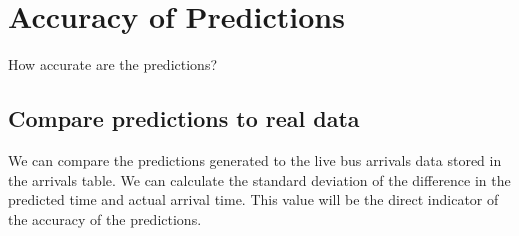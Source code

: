 \section{Accuracy of Predictions}
How accurate are the predictions?
\subsection{Compare predictions to real data}
We can compare the predictions generated to the live bus arrivals data stored in the arrivals table. We can calculate the standard deviation of the difference in the predicted time and actual arrival time. This value will be the direct indicator of the accuracy of the predictions.

